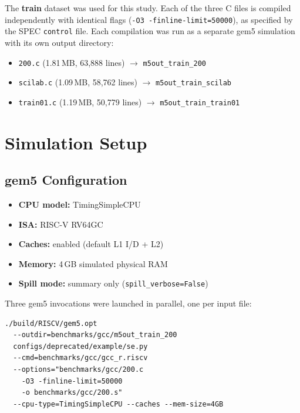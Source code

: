 \documentclass[conference]{IEEEtran}
\begin{document}
The \textbf{train} dataset was used for this study. Each of the three
C files is compiled independently with identical flags
(\texttt{-O3 -finline-limit=50000}), as specified by the SPEC
\texttt{control} file. Each compilation was run as a separate gem5
simulation with its own output directory:

\begin{itemize}
    \item \texttt{200.c} (1.81\,MB, 63,888 lines) $\rightarrow$ \texttt{m5out\_train\_200}
    \item \texttt{scilab.c} (1.09\,MB, 58,762 lines) $\rightarrow$ \texttt{m5out\_train\_scilab}
    \item \texttt{train01.c} (1.19\,MB, 50,779 lines) $\rightarrow$ \texttt{m5out\_train\_train01}
\end{itemize}

\section{Simulation Setup}

\subsection{gem5 Configuration}

\begin{itemize}
    \item \textbf{CPU model:}   TimingSimpleCPU
    \item \textbf{ISA:}         RISC-V RV64GC
    \item \textbf{Caches:}      enabled (default L1 I/D + L2)
    \item \textbf{Memory:}      4\,GB simulated physical RAM
    \item \textbf{Spill mode:}  summary only (\texttt{spill\_verbose=False})
\end{itemize}

Three gem5 invocations were launched in parallel, one per input file:

\begin{verbatim}
./build/RISCV/gem5.opt
  --outdir=benchmarks/gcc/m5out_train_200
  configs/deprecated/example/se.py
  --cmd=benchmarks/gcc/gcc_r.riscv
  --options="benchmarks/gcc/200.c
    -O3 -finline-limit=50000
    -o benchmarks/gcc/200.s"
  --cpu-type=TimingSimpleCPU --caches --mem-size=4GB
\end{verbatim}
\end{document}
